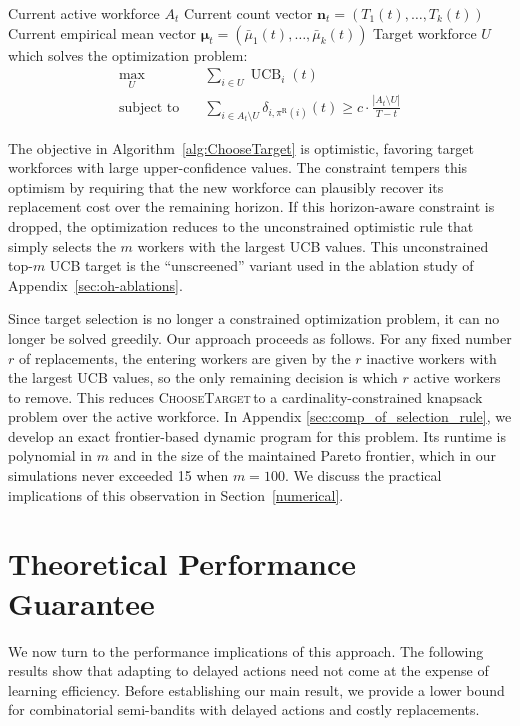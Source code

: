 \documentclass[opre,blindrev]{informs3}
\newcommand{\UCB}{\operatorname{UCB}}
\newcommand{\ChooseTarget}{\textsc{ChooseTarget}\,}
\begin{document}
\begin{algorithm}
    \caption{ChooseTarget}
    \label{alg:ChooseTarget}
    \begin{algorithmic}[1]
        \Require Current active workforce \(A_t\)
        \Require Current count vector \(\mathbf{n}_t=(T_1(t),\dots,T_k(t))\)
        \Require Current empirical mean vector \(\boldsymbol{\mu}_t=(\bar{\mu}_1(t),\dots,\bar{\mu}_k(t))\)
        \State \Return Target workforce \(U\) which solves the optimization problem:
        \begin{align}\label{eq:opt}
            \max_{U} \quad & \sum_{i\in U}\UCB_i(t)\\
            \text{subject to}\quad &\sum_{i\in A_t\setminus U}\delta_{i,\pi^\mathrm{R}(i)}(t)\geq c\cdot \frac{| A_t\setminus U|}{T-t}
        \end{align}
    \end{algorithmic}
\end{algorithm}
The objective in Algorithm~\ref{alg:ChooseTarget} is optimistic, favoring target workforces with large upper-confidence values. The constraint tempers this optimism by requiring that the new workforce can plausibly recover its replacement cost over the remaining horizon. If this horizon-aware constraint is dropped, the optimization reduces to the unconstrained optimistic rule that simply selects the \(m\) workers with the largest UCB values. This unconstrained top-\(m\) UCB target is the ``unscreened'' variant used in the ablation study of Appendix~\ref{sec:oh-ablations}.

\begin{remark}
    Since target selection is no longer a constrained optimization problem, it can no longer be solved greedily. Our approach proceeds as follows. For any fixed number \(r\) of replacements, the entering workers are given by the \(r\) inactive workers with the largest UCB values, so the only remaining decision is which \(r\) active workers to remove. This reduces \ChooseTarget to a cardinality-constrained knapsack problem over the active workforce. In Appendix \ref{sec:comp_of_selection_rule}, we develop an exact frontier-based dynamic program for this problem. Its runtime is polynomial in \(m\) and in the size of the maintained Pareto frontier, which in our simulations never exceeded 15 when \(m=100\). We discuss the practical implications of this observation in Section~\ref{numerical}.
\end{remark}

\section{Theoretical Performance Guarantee}
\label{theoretical}
We now turn to the performance implications of this approach. The following results show that adapting to delayed actions need not come at the expense of learning efficiency. Before establishing our main result, we provide a lower bound for combinatorial semi-bandits with delayed actions and costly replacements.
\end{document}
